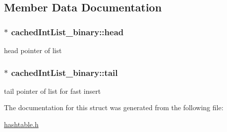 \subsection{Member Data Documentation}
\subsubsection[{\texorpdfstring{head}{head}}]{$\ast$ cached\+Int\+List\+\_\+binary\+::head}\hypertarget{structcachedIntList__binary_ab51ea19cb68af38612cad45b08d9239f}{}\label{structcachedIntList__binary_ab51ea19cb68af38612cad45b08d9239f}
head pointer of list 
\subsubsection[{\texorpdfstring{tail}{tail}}]{$\ast$ cached\+Int\+List\+\_\+binary\+::tail}\hypertarget{structcachedIntList__binary_ad92905f1242fc89c700572d0d510c17f}{}\label{structcachedIntList__binary_ad92905f1242fc89c700572d0d510c17f}
tail pointer of list for fast insert 

The documentation for this struct was generated from the following file\+:\begin{DoxyCompactItemize}
\item 
\hyperlink{hashtable_8h}{hashtable.\+h}\end{DoxyCompactItemize}
